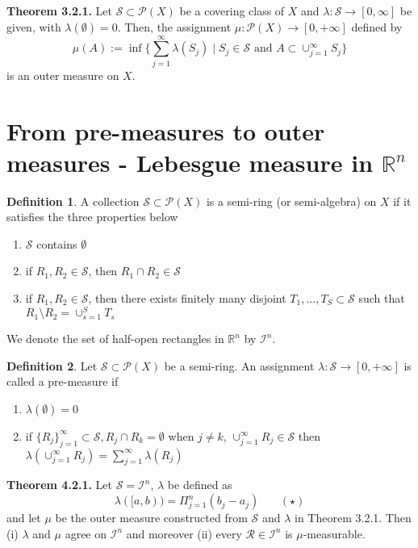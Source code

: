 \documentclass[a4paper,14pt]{extarticle}
\theoremstyle{definition}
\newtheorem{definition}{Definition}
\begin{document}
\noindent\textbf{Theorem 3.2.1.} Let $\mathcal{S}\subset\mathcal{P}(X)$ be a covering class of $X$ and $\lambda:\mathcal{S}\rightarrow[0,\infty]$ be given, with $\lambda(\emptyset)=0$. Then, the 
assignment $\mu:\mathcal{P}(X)\rightarrow[0,+\infty]$ defined by 
\[\mu(A):=\inf\bigl\{\sum_{j=1}^\infty\lambda(S_j)\mid S_j\in\mathcal{S}\text{ and }A\subset\cup_{j=1}^\infty S_j\bigr\}\] is an outer measure on $X$.
\newpage
\section{From pre-measures to outer measures - Lebesgue measure in $\mathbb{R}^n$}
\begin{definition}
  A collection $\mathcal{S}\subset\mathcal{P}(X)$
  is a semi-ring (or semi-algebra) on $X$ if 
  it satisfies the three properties below
  \begin{enumerate}
    \item $\mathcal{S}$ contains $\emptyset$
    \item if $R_1,R_2\in\mathcal{S}$, then $R_1\cap R_2\in\mathcal{S}$
    \item if $R_1,R_2\in\mathcal{S}$, then there exists finitely many disjoint $T_1,\ldots,T_S
    \subset\mathcal{S}$ such that $R_1\setminus R_2=\cup_{s=1}^S T_s$
  \end{enumerate}
\end{definition}
\noindent We denote the set of half-open rectangles in $\mathbb{R}^n$ by $\mathcal{I}^n$.
\begin{definition}
  Let $\mathcal{S}\subset\mathcal{P}(X)$ be a 
  semi-ring. An assignment $\lambda:\mathcal{S}\rightarrow[0,+\infty]$ is called a 
  pre-measure if 
  \begin{enumerate}
    \item $\lambda(\emptyset)=0$
    \item if $\{R_j\}_{j=1}^\infty\subset\mathcal{S}, R_j\cap R_k=\emptyset$ when $j\neq k$,
     $\cup_{j=1}^\infty R_j\in\mathcal{S}$ then $\lambda(\cup_{j=1}^\infty R_j)=\sum_{j=1}^\infty\lambda(R_j)$
  \end{enumerate}
\end{definition}
\noindent\textbf{Theorem 4.2.1.} Let $\mathcal{S}=\mathcal{I}^n$, $\lambda$ be defined as 
\[\lambda([a,b))=\Pi_{j=1}^n(b_j-a_j)\,\,\,\,\,\,\,\,\,\,\,(\star)\] and let 
$\mu$ be the outer measure constructed from $\mathcal{S}$ and $\lambda$ in Theorem 3.2.1. Then (i) $\lambda$ and $\mu$ agree on $\mathcal{I}^n$ and moreover (ii) every $\mathcal{R}\in\mathcal{I}^n$ is $\mu$-measurable.
\end{document}
